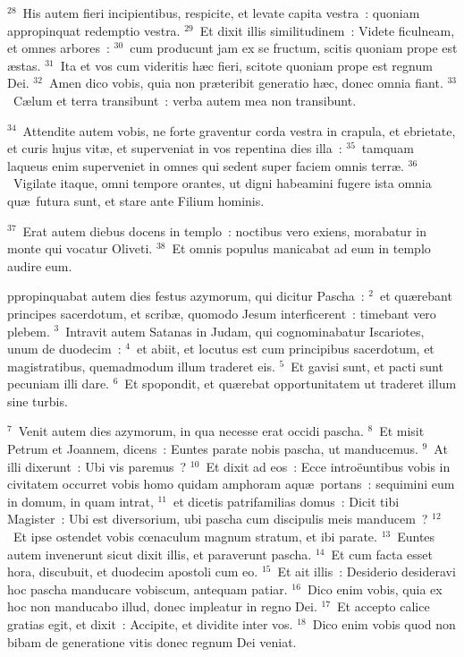 ${}^{28}$~His autem fieri incipientibus, respicite, et levate capita vestra~: quoniam appropinquat redemptio vestra.
${}^{29}$~Et dixit illis similitudinem~: Videte ficulneam, et omnes arbores~:
${}^{30}$~cum producunt jam ex se fructum, scitis quoniam prope est \ae stas.
${}^{31}$~Ita et vos cum videritis h\ae c fieri, scitote quoniam prope est regnum Dei.
${}^{32}$~Amen dico vobis, quia non pr\ae teribit generatio h\ae c, donec omnia fiant.
${}^{33}$~C\ae lum et terra transibunt~: verba autem mea non transibunt.


${}^{34}$~Attendite autem vobis, ne forte graventur corda vestra in crapula, et ebrietate, et curis hujus vit\ae , et superveniat in vos repentina dies illa~:
${}^{35}$~tamquam laqueus enim superveniet in omnes qui sedent super faciem omnis terr\ae .
${}^{36}$~Vigilate itaque, omni tempore orantes, ut digni habeamini fugere ista omnia qu\ae\ futura sunt, et stare ante Filium hominis.


${}^{37}$~Erat autem diebus docens in templo~: noctibus vero exiens, morabatur in monte qui vocatur Oliveti.
${}^{38}$~Et omnis populus manicabat ad eum in templo audire eum.

\bchapter
{}ppropinquabat autem dies festus azymorum, qui dicitur Pascha~:
${}^{2}$~et qu\ae rebant principes sacerdotum, et scrib\ae , quomodo Jesum interficerent~: timebant vero plebem.
${}^{3}$~Intravit autem Satanas in Judam, qui cognominabatur Iscariotes, unum de duodecim~:
${}^{4}$~et abiit, et locutus est cum principibus sacerdotum, et magistratibus, quemadmodum illum traderet eis.
${}^{5}$~Et gavisi sunt, et pacti sunt pecuniam illi dare.
${}^{6}$~Et spopondit, et qu\ae rebat opportunitatem ut traderet illum sine turbis.


${}^{7}$~Venit autem dies azymorum, in qua necesse erat occidi pascha.
${}^{8}$~Et misit Petrum et Joannem, dicens~: Euntes parate nobis pascha, ut manducemus.
${}^{9}$~At illi dixerunt~: Ubi vis paremus~?
${}^{10}$~Et dixit ad eos~: Ecce intro\"euntibus vobis in civitatem occurret vobis homo quidam amphoram aqu\ae\ portans~: sequimini eum in domum, in quam intrat,
${}^{11}$~et dicetis patrifamilias domus~: Dicit tibi Magister~: Ubi est diversorium, ubi pascha cum discipulis meis manducem~?
${}^{12}$~Et ipse ostendet vobis cœnaculum magnum stratum, et ibi parate.
${}^{13}$~Euntes autem invenerunt sicut dixit illis, et paraverunt pascha.
${}^{14}$~Et cum facta esset hora, discubuit, et duodecim apostoli cum eo.
${}^{15}$~Et ait illis~: Desiderio desideravi hoc pascha manducare vobiscum, antequam patiar.
${}^{16}$~Dico enim vobis, quia ex hoc non manducabo illud, donec impleatur in regno Dei.
${}^{17}$~Et accepto calice gratias egit, et dixit~: Accipite, et dividite inter vos.
${}^{18}$~Dico enim vobis quod non bibam de generatione vitis donec regnum Dei veniat.


